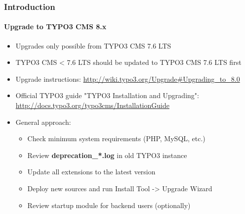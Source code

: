 \begin{frame}[fragile]
	\frametitle{Introduction}
	\framesubtitle{Upgrade to TYPO3 CMS 8.x}

	\begin{itemize}
		\item Upgrades only possible from TYPO3 CMS 7.6 LTS
		\item TYPO3 CMS < 7.6 LTS should be updated to TYPO3 CMS 7.6 LTS first
	\end{itemize}

	\begin{itemize}

		\item Upgrade instructions:\newline
			\smaller\url{http://wiki.typo3.org/Upgrade#Upgrading_to_8.0}\normalsize
		\item Official TYPO3 guide "TYPO3 Installation and Upgrading":
			\smaller\url{http://docs.typo3.org/typo3cms/InstallationGuide}\normalsize
		\item General approach:
			\begin{itemize}
				\item Check minimum system requirements \small(PHP, MySQL, etc.)
				\item Review \textbf{deprecation\_*.log} in old TYPO3 instance
				\item Update all extensions to the latest version
				\item Deploy new sources and run Install Tool -> Upgrade Wizard
				\item Review startup module for backend users (optionally)
			\end{itemize}
	\end{itemize}

\end{frame}


